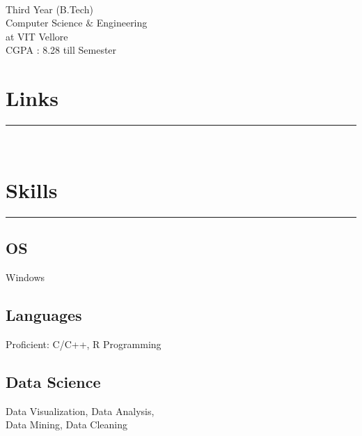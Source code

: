 \documentclass[]{meetresume-class}
\begin{document}
	
	
	\begin{minipage}[t]{0.33\textwidth} 
		\begin{large}
			\\
		\end{large}
		Third Year (B.Tech)\\
		Computer Science $\&$ Engineering\\ 
		at VIT Vellore \\ 
		CGPA : 8.28 till  Semester 
		
		
		\section{Links} 
		\noindent\rule{5cm}{0.6pt}
		
		\href{https://github.com/MeetDarkPow}{} \\
		\href{https://www.linkedin.com/in/meet-bhatnagar-a41842181/}{}
		\sectionsep
		\section{Skills}
		\noindent\rule{5cm}{0.6pt}
	
		\subsection{OS}
		Windows
		\vspace{6pt}
		
		\subsection{Languages}
		Proficient: C/C++, R Programming
		\vspace{6pt}
		
		\subsection{Data Science}
		Data Visualization, Data Analysis,\\
		Data Mining, Data Cleaning
		\vspace{6pt}
		

\end{minipage}
\end{document}
